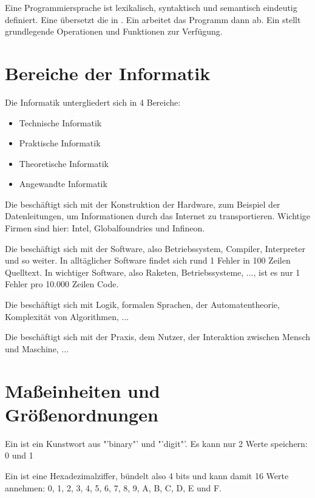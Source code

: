 Eine Programmiersprache ist lexikalisch, syntaktisch und semantisch eindeutig definiert. Eine  übersetzt die  in . Ein  arbeitet das Programm dann ab. Ein  stellt grundlegende Operationen und Funktionen zur Verfügung.

\section{Bereiche der Informatik}

Die Informatik untergliedert sich in 4 Bereiche:
\begin{itemize}
	\item Technische Informatik
	\item Praktische Informatik
	\item Theoretische Informatik
	\item Angewandte Informatik
\end{itemize}

Die  beschäftigt sich mit der Konstruktion der Hardware, zum Beispiel der Datenleitungen, um Informationen durch das Internet zu transportieren. Wichtige Firmen sind hier: Intel, Globalfoundries und Infineon.

Die  beschäftigt sich mit der Software, also Betriebssystem, Compiler, Interpreter und so weiter. In alltäglicher Software findet sich rund 1 Fehler in 100 Zeilen Quelltext. In wichtiger Software, also Raketen, Betriebssysteme, ...,  ist es nur 1 Fehler pro 10.000 Zeilen Code.

Die  beschäftigt sich mit Logik, formalen Sprachen, der Automatentheorie, Komplexität von Algorithmen, ...

Die  beschäftigt sich mit der Praxis, dem Nutzer, der Interaktion zwischen Mensch und Maschine, ...

\section{Maßeinheiten und Größenordnungen}

Ein  ist ein Kunstwort aus "'binary"' und "'digit"'. Es kann nur 2 Werte speichern: 0 und 1

Ein  ist eine Hexadezimalziffer, bündelt also 4 bits und kann damit 16 Werte annehmen: 0, 1, 2, 3, 4, 5, 6, 7, 8, 9, A, B, C, D, E und F.


